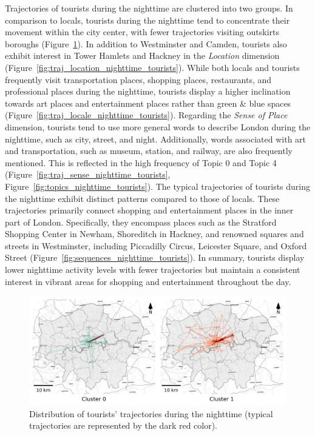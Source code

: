 \documentclass{article}
\theoremstyle{remark}
\begin{document}
Trajectories of tourists during the nighttime are clustered into two groups. In comparison to locals, tourists during the nighttime tend to concentrate their movement within the city center, with fewer trajectories visiting outskirts boroughs (Figure~\ref{fig:traj_distribution_nighttime_tourists}). In addition to Westminster and Camden, tourists also exhibit interest in Tower Hamlets and Hackney in the \textit{Location} dimension (Figure~\ref{fig:traj_location_nighttime_tourists}). While both locals and tourists frequently visit transportation places, shopping places, restaurants, and professional places during the nighttime, tourists display a higher inclination towards art places and entertainment places rather than green \& blue spaces (Figure~\ref{fig:traj_locale_nighttime_tourists}). Regarding the \textit{Sense of Place} dimension, tourists tend to use more general words to describe London during the nighttime, such as city, street, and night. Additionally, words associated with art and transportation, such as museum, station, and railway, are also frequently mentioned. This is reflected in the high frequency of Topic 0 and Topic 4 (Figure~\ref{fig:traj_sense_nighttime_tourists}, Figure~\ref{fig:topics_nighttime_tourists}). The typical trajectories of tourists during the nighttime exhibit distinct patterns compared to those of locals. These trajectories primarily connect shopping and entertainment places in the inner part of London. Specifically, they encompass places such as the Stratford Shopping Center in Newham, Shoreditch in Hackney, and renowned squares and streets in Westminster, including Piccadilly Circus, Leicester Square, and Oxford Street (Figure~\ref{fig:sequences_nighttime_tourists}). In summary, tourists display lower nighttime activity levels with fewer trajectories but maintain a consistent interest in vibrant areas for shopping and entertainment throughout the day.

\begin{figure}[!h]
\centering
\includegraphics[width=1\textwidth]{figures/traj_distribution_nighttime_tourists.png}
\caption{\label{fig:traj_distribution_nighttime_tourists}Distribution of tourists' trajectories during the nighttime (typical trajectories are represented by the dark red color).}
\end{figure}
\end{document}
